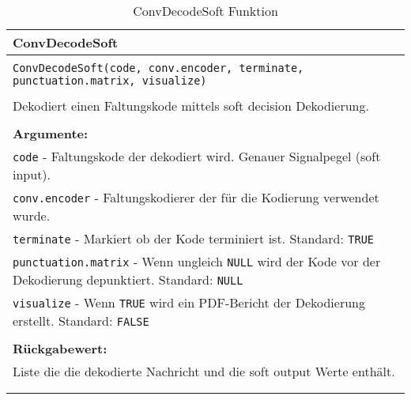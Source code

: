 \begin{longtable}{|p{\textwidth}|}
\hline
\rowcolor{lightblue}
ConvDecodeSoft
\\
\hline
\\
\texttt{ConvDecodeSoft(code, conv.encoder, terminate, punctuation.matrix, visualize)}\\
\\
Dekodiert einen Faltungskode mittels soft decision Dekodierung.\\
\\
\textbf{Argumente:}\\
\texttt{code} - Faltungskode der dekodiert wird. Genauer Signalpegel (soft input).\\
\texttt{conv.encoder} - Faltungskodierer der für die Kodierung verwendet wurde.\\
\texttt{terminate} - Markiert ob der Kode terminiert ist. Standard: \texttt{TRUE}\\
\texttt{punctuation.matrix} - Wenn ungleich \texttt{NULL} wird der Kode vor der Dekodierung depunktiert. Standard: \texttt{NULL}\\
\texttt{visualize} - Wenn \texttt{TRUE} wird ein PDF-Bericht der Dekodierung erstellt. Standard: \texttt{FALSE}\\
\\
\textbf{Rückgabewert:}\\
Liste die die dekodierte Nachricht und die soft output Werte enthält.\\
\\
\hline
\caption{ConvDecodeSoft Funktion}
\end{longtable}